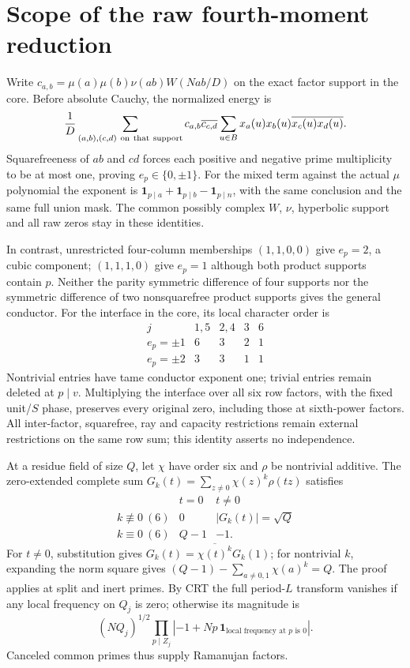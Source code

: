 \section{Scope of the raw fourth-moment reduction}
\label{upq:details}
Write $c_{a,b}=\mu(a)\mu(b)\nu(ab)W(Nab/D)$ on the exact factor support
in the core. Before absolute Cauchy, the normalized energy is
\[
 \frac1D\sum_{\substack{(a,b),(c,d)\ {\rm on\ that\ support}}}
 c_{a,b}\overline{c_{c,d}}
 \sum_{u\in B}x_a(u)x_b(u)\overline{x_c(u)x_d(u)}.
\]
Squarefreeness of $ab$ and $cd$ forces each positive and negative
prime multiplicity to be at most one, proving $e_p\in\{0,\pm1\}$.
For the mixed term against the actual $\mu$ polynomial the exponent is
$\mathbf1_{p\mid a}+\mathbf1_{p\mid b}-\mathbf1_{p\mid n}$,
with the same conclusion and the same full union mask.
The common possibly complex $W$, $\nu$, hyperbolic support and all raw
zeros stay in these identities.

In contrast, unrestricted four-column memberships $(1,1,0,0)$ give
$e_p=2$, a cubic component; $(1,1,1,0)$ give $e_p=1$ although both
product supports contain $p$. Neither the parity symmetric difference
of four supports nor the symmetric difference of two nonsquarefree
product supports gives the general conductor.
For the interface in the core, its local character order is
\[
 \begin{array}{c|cccc}
 j&1,5&2,4&3&6\\ \hline
 e_p=\pm1&6&3&2&1\\
 e_p=\pm2&3&3&1&1
 \end{array}
\]
Nontrivial entries have tame conductor exponent one; trivial entries
remain deleted at $p\mid v$. Multiplying the interface over all six
row factors, with the fixed unit/$S$ phase, preserves every original
zero, including those at sixth-power factors. All inter-factor,
squarefree, ray and capacity restrictions remain external restrictions
on the same row sum; this identity asserts no independence.

At a residue field of size $Q$, let $\chi$ have order six and $\rho$
be nontrivial additive. The zero-extended complete sum
$G_k(t)=\sum_{z\ne0}\chi(z)^k\rho(tz)$ satisfies
\[
 \begin{array}{c|cc}
 &t=0&t\ne0\\ \hline
 k\not\equiv0\ (6)&0&|G_k(t)|=\sqrt Q\\
 k\equiv0\ (6)&Q-1&-1.
 \end{array}
\]
For $t\ne0$, substitution gives
$G_k(t)=\overline{\chi(t)^k}G_k(1)$; for nontrivial $k$,
expanding the norm square gives
$(Q-1)-\sum_{a\ne0,1}\chi(a)^k=Q$.
The proof applies at split and inert primes. By CRT the full period-$L$
transform vanishes if any local frequency on $Q_j$ is zero; otherwise
its magnitude is
\[
 (NQ_j)^{1/2}
 \prod_{p\mid Z_j}
 \left|-1+Np\,\mathbf1_{\text{local frequency at }p\text{ is }0}\right|.
\]
Canceled common primes thus supply Ramanujan factors.

